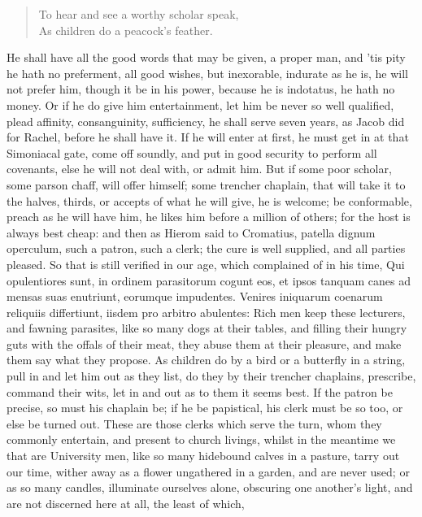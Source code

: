 {\begin{verse}
To hear and see a worthy scholar speak,\\
As children do a peacock's feather.
\end{verse}

He shall have all the good words that may be given, a proper man,
and 'tis pity he hath no preferment, all good wishes, but inexorable,
indurate as he is, he will not prefer him, though it be in his power,
because he is indotatus, he hath no money. Or if he do give him
entertainment, let him be never so well qualified, plead affinity,
consanguinity, sufficiency, he shall serve seven years, as Jacob did
for Rachel, before he shall have it. If he will enter at first,
he must get in at that Simoniacal gate, come off soundly, and put in
good security to perform all covenants, else he will not deal with, or
admit him. But if some poor scholar, some parson chaff, will offer
himself; some trencher chaplain, that will take it to the halves,
thirds, or accepts of what he will give, he is welcome; be conformable,
preach as he will have him, he likes him before a million of others;
for the host is always best cheap: and then as Hierom said to
Cromatius, patella dignum operculum, such a patron, such a clerk; the
cure is well supplied, and all parties pleased. So that is still
verified in our age, which \Chrysostom{} complained of in his time,
Qui opulentiores sunt, in ordinem parasitorum cogunt eos, et ipsos
tanquam canes ad mensas suas enutriunt, eorumque impudentes. Venires
iniquarum coenarum reliquiis differtiunt, iisdem pro arbitro abulentes:
Rich men keep these lecturers, and fawning parasites, like so many dogs
at their tables, and filling their hungry guts with the offals of their
meat, they abuse them at their pleasure, and make them say what they
propose. As children do by a bird or a butterfly in a string,
pull in and let him out as they list, do they by their trencher
chaplains, prescribe, command their wits, let in and out as to them it
seems best. If the patron be precise, so must his chaplain be; if he be
papistical, his clerk must be so too, or else be turned out. These are
those clerks which serve the turn, whom they commonly entertain, and
present to church livings, whilst in the meantime we that are
University men, like so many hidebound calves in a pasture, tarry out
our time, wither away as a flower ungathered in a garden, and are never
used; or as so many candles, illuminate ourselves alone, obscuring one
another's light, and are not discerned here at all, the least of which,
}

